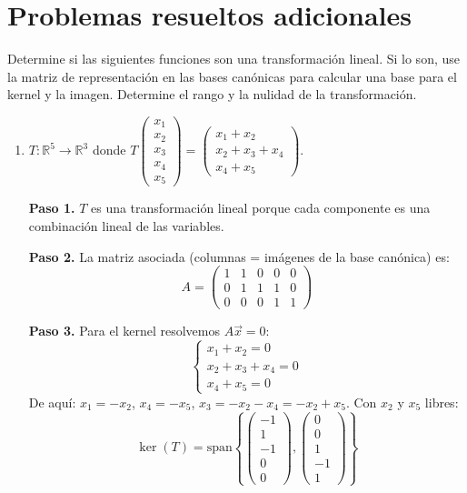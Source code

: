 \section{Problemas resueltos adicionales}


\begin{prob}
Determine si las siguientes funciones son una transformación lineal. Si lo son, use la matriz de representación en las bases canónicas para calcular una base para el kernel y la imagen. Determine el rango y la nulidad de la transformación.

\begin{enumerate}[$a)$]

\item $T:\mathbb{R}^5\rightarrow \mathbb{R}^3$ donde $T\begin{pmatrix}
x_1\\x_2\\x_3\\x_4\\x_5
\end{pmatrix}=\begin{pmatrix}
x_1+x_2\\x_2+x_3+x_4\\x_4+x_5
\end{pmatrix}.$
\begin{myproof}
\textbf{Paso 1.} $T$ es una transformación lineal porque cada componente es una combinación lineal de las variables.

\textbf{Paso 2.} La matriz asociada (columnas = imágenes de la base canónica) es:
\[
A = \begin{pmatrix}
1 & 1 & 0 & 0 & 0 \\
0 & 1 & 1 & 1 & 0 \\
0 & 0 & 0 & 1 & 1
\end{pmatrix}
\]

\textbf{Paso 3.} Para el kernel resolvemos $A\vec{x}=0$:
\[
\begin{cases}
x_1 + x_2 = 0 \\
x_2 + x_3 + x_4 = 0 \\
x_4 + x_5 = 0
\end{cases}
\]
De aquí: $x_1 = -x_2$, $x_4 = -x_5$, $x_3 = -x_2 - x_4 = -x_2 + x_5$. Con $x_2$ y $x_5$ libres:
\[
\ker(T) = \text{span}\left\{
\begin{pmatrix}-1\\1\\-1\\0\\0\end{pmatrix},
\begin{pmatrix}0\\0\\1\\-1\\1\end{pmatrix}
\right\}
\]


\end{myproof}
\end{enumerate}
\end{prob}
